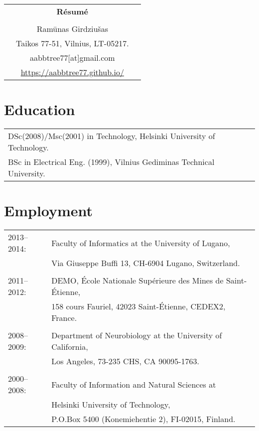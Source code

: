 \documentclass[a4paper,11pt]{article}
\begin{document}
\thispagestyle{empty}

%
%
\begin{center}
\begin{tabular}{ccc}
&\Large \textbf{R\'{e}sum\'{e}}&\\
\\
& Ram\={u}nas Girdziu\v{s}as &\\  
& Taikos 77-51, Vilnius, LT-05217. &\\
& aabbtree77[at]gmail.com &\\
& \url{https://aabbtree77.github.io/}
\end{tabular}
\end{center}
%
\section*{Education}
%
\begin{tabular}{ll}
        DSc(2008)/Msc(2001) in Technology, Helsinki University of Technology. \\
        BSc in Electrical Eng. (1999), Vilnius Gediminas Technical University. 
\end{tabular}
%
\section*{Employment}
%
\begin{tabular}{ll}
2013--2014: & Faculty of Informatics at the University of Lugano,\\
                        & Via Giuseppe Buffi 13, CH-6904 Lugano, Switzerland. \\
&\\
2011--2012: & DEMO, \'{E}cole Nationale Sup\'{e}rieure des Mines de Saint-\'{E}tienne,\\
&158 cours Fauriel, 42023 Saint-\'Etienne, CEDEX2, France. \\
&\\
2008--2009: & Department of Neurobiology at the University of California,\\
&Los Angeles, 73-235 CHS, CA 90095-1763. \\
&\\
2000--2008: & Faculty of Information and Natural Sciences at\\
            & Helsinki University of Technology,\\ 
&  P.O.Box 5400 (Konemiehentie 2), FI-02015, Finland. \\
\end{tabular}
\end{document}
